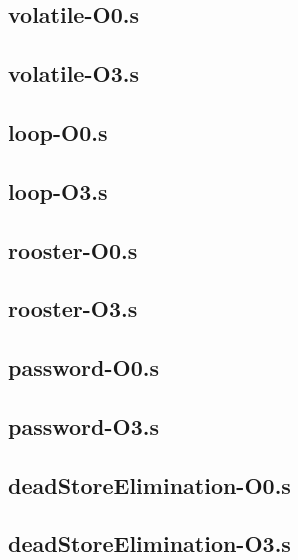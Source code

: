 \begin{appendices}
\subsection{volatile-O0.s}

\subsection{volatile-O3.s}


\subsection{loop-O0.s}

\subsection{loop-O3.s}


\subsection{rooster-O0.s}

\subsection{rooster-O3.s}


\subsection{password-O0.s}

\subsection{password-O3.s}


\subsection{deadStoreElimination-O0.s}

\subsection{deadStoreElimination-O3.s}



\end{appendices}
